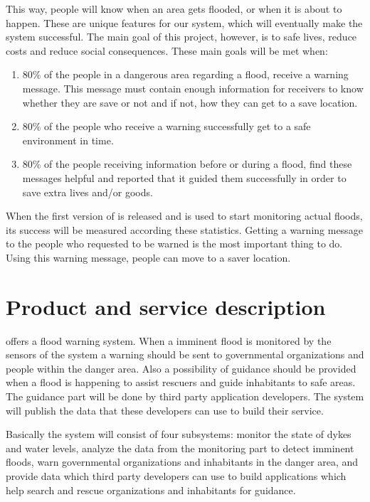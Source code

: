 This way, people will know when an area gets flooded, or when it is about to happen. 
These are unique features for our system, which will eventually make the system successful. The main goal of this project, however, is to safe lives, reduce costs and reduce social consequences. These main goals will be met when:
\begin{enumerate}
	\item 80\% of the people in a dangerous area regarding a flood, receive a warning message. This message must contain enough information for receivers to know whether they are save or not and if not, how they can get to a save location.
	\item 80\% of the people who receive a warning successfully get to a safe environment in time.
	\item 80\% of the people receiving information before or during a flood, find these messages helpful and reported that it guided them successfully in order to save extra lives and/or goods.
\end{enumerate}

When the first version of \ProjectName{} is released and is used to start monitoring actual floods, its success will be measured according these statistics. Getting a warning message to the people who requested to be warned is the most important thing to do. Using this warning message, people can move to a saver location.


\section{Product and service description}
\CompanyName{} offers a flood warning system. When a imminent flood is monitored by the sensors of the system a warning should be sent to governmental organizations and people within the danger area. Also a possibility of guidance should be provided when a flood is happening to assist rescuers and guide inhabitants to safe areas. The guidance part will be done by third party application developers. The system will publish the data that these developers can use to build their service.

Basically the system will consist of four subsystems: monitor the state of dykes and water levels, analyze the data from the monitoring part to detect imminent floods, warn governmental organizations and inhabitants in the danger area, and provide data which third party developers can use to build applications which help search and rescue organizations and inhabitants for guidance.

